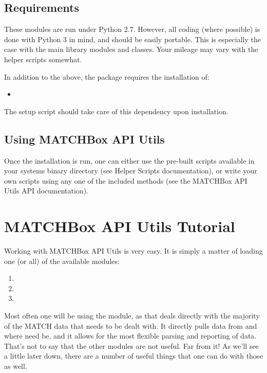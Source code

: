 \documentclass[letterpaper,10pt,english]{sphinxmanual}
\begin{document}
\section{Requirements}
\label{\detokenize{intro:requirements}}
These modules are run under Python 2.7.  However, all coding (where possible) is
done with Python 3 in mind, and should be easily portable. This is especially the
case with the main library modules and classes.  Your mileage may vary with the
helper scripts somewhat.

In addition to the above, the package requires the installation of:
\begin{itemize}
\item {} 

\end{itemize}

The setup script should take care of this dependency upon installation.


\section{Using MATCHBox API Utils}
\label{\detokenize{intro:using-matchbox-api-utils}}
Once the installation is run, one can either use the pre-built scripts available
in your systems binary directory (see Helper Scripts documentation), or write
your own scripts using any one of the included methods (see the MATCHBox API Utils
API documentation).


\chapter{MATCHBox API Utils Tutorial}
\label{\detokenize{tutorial:matchbox-api-utils-tutorial}}\label{\detokenize{tutorial::doc}}
Working with MATCHBox API Utils is very easy.  It is simply a matter of loading one
(or all) of the available modules:
\begin{enumerate}
\item {} 

\item {} 

\item {} 

\end{enumerate}

Most often one will be using the  module, as that deals directly
with the majority of the MATCH data that needs to be dealt with.  It directly pulls
data from  and  where need be, and it allows for the
most flexible parsing and reporting of data.  That’s not to say that the other
modules are not useful.  Far from it!  As we’ll see a little later down, there are
a number of useful things that one can do with those as well.
\end{document}
